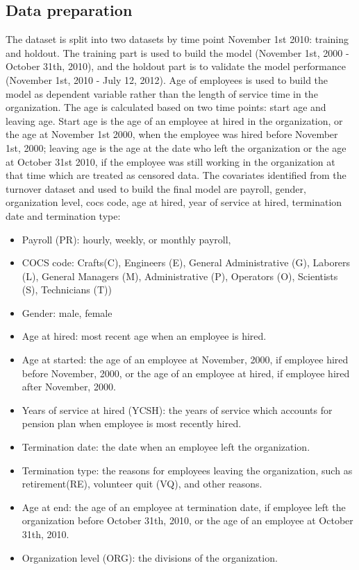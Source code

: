 \subsection{Data preparation}
The dataset is split into two datasets by time point November 1st 2010: training and holdout. The training part is used to build the model (November 1st, 2000 - October 31th, 2010), and the holdout part is to validate the model performance (November 1st, 2010 - July 12, 2012). Age of employees is used to build the model as dependent variable rather than the length of service time in the organization. The age is calculated based on two time points: start age and leaving age. Start age is the age of an employee at hired in the organization, or the age at November 1st 2000, when the employee was hired before November 1st, 2000; leaving age is the age at the date who left the organization or the age at October 31st 2010, if the employee was still working in the organization at that time which are treated as censored data. The covariates identified from the turnover dataset and used to build the final model are payroll, gender, organization level, cocs code, age at hired, year of service at hired, termination date and termination type: 
\begin{itemize}
	
	\item Payroll (PR): hourly, weekly, or monthly payroll, 
	\item COCS code: Crafts(C), Engineers (E), General Administrative (G), Laborers (L), General Managers (M),  Administrative (P),  Operators (O), Scientists (S), Technicians (T))
	\item Gender: male, female
	\item Age at hired: most recent age when an employee is hired.
	\item Age at started: the age of an employee at November, 2000, if employee hired before November, 2000, or the age of an employee at hired, if employee hired after November, 2000. 
	
	\item Years of service at hired (YCSH): the years of service which accounts for pension plan when employee is most recently hired.
	\item Termination date: the date when an employee left the organization.
	\item Termination type: the reasons for employees leaving the organization, such as retirement(RE),  volunteer quit (VQ), and other reasons. 
	\item Age at end: the age of an employee at termination date, if employee left the organization before October 31th, 2010, or the age of an employee at October 31th, 2010.
	\item Organization level (ORG): the divisions of the organization.
\end{itemize}
